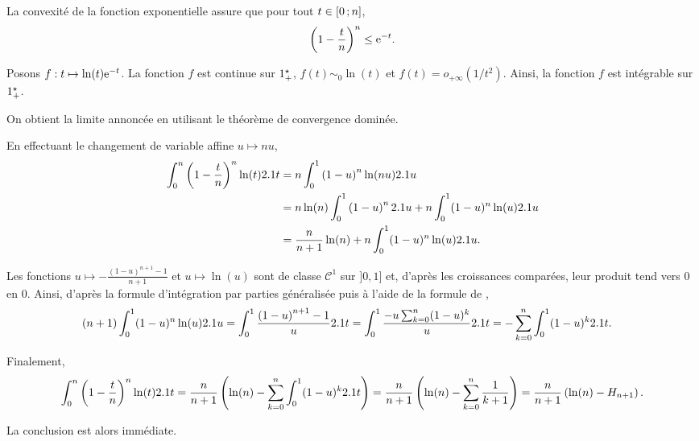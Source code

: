 \begin{solution}
\begin{reponses}
\item La convexité de la fonction exponentielle assure que pour tout $t \in \left[0\,;n\right]$,
\[
\left(1 - \frac{t}{n}\right)^n \leq \mathrm{e}^{-t}.
\]

Posons $f : t \mapsto \ln(t) \mathrm{e}^{-t}$. La fonction $f$ est continue sur $1^\star_+$, $f(t) \sim_0 \ln(t)$ et $f(t) = o_{+\infty}(1/t^2)$. Ainsi, la fonction $f$ est intégrable sur $1^\star_+$.

On obtient la limite annoncée en utilisant le théorème de convergence dominée.

\item En effectuant le changement de variable affine $u \mapsto n u$,
\begin{align*}
\int_0^n \left(1 - \frac{t}{n}\right)^n \ln(t) 2.1 t
&= n \int_0^1 \left(1 - u\right)^n \ln(n u) 2.1 u\\
&= n \ln(n) \int_0^1 \left(1 - u\right)^n 2.1 u + n \int_0^1 (1 - u)^n \ln(u) 2.1 u\\
&= \frac{n}{n+1} \ln(n) + n \int_0^1 (1 - u)^n \ln(u) 2.1 u.
\end{align*}

\item Les fonctions $u \mapsto -\frac{(1 - u)^{n+1} - 1}{n+1}$ et $u \mapsto \ln(u)$ sont de classe $\mathscr{C}^1$ sur $]0, 1]$ et, d'après les croissances comparées, leur produit tend vers $0$ en $0$. Ainsi, d'après la formule d'intégration par parties généralisée puis à l'aide de la formule de ,
\begin{align*}
(n+1) \int_0^1 (1 - u)^n \ln(u) 2.1 u
&= \int_0^1 \frac{\left(1 - u\right)^{n+1} - 1}{u} 2.1 t
= \int_0^1 \frac{- u \sum_{k=0}^n (1 - u)^k}{u} 2.1 t
= -\sum_{k=0}^n \int_0^1 (1 - u)^k 2.1 t.
\end{align*}

\item Finalement,
\begin{align*}
\int_0^n \left(1 - \frac{t}{n}\right)^n \ln(t) 2.1 t
&= \frac{n}{n+1} \left(\ln(n) - \sum_{k=0}^n \int_0^1 (1 - u)^k 2.1 t\right)
= \frac{n}{n+1} \left(\ln(n) - \sum_{k=0}^n \frac{1}{k+1}\right)
= \frac{n}{n+1} \left(\ln(n) - H_{n+1}\right).\\
\end{align*}

\item La conclusion est alors immédiate.
\end{reponses}
\end{solution}



